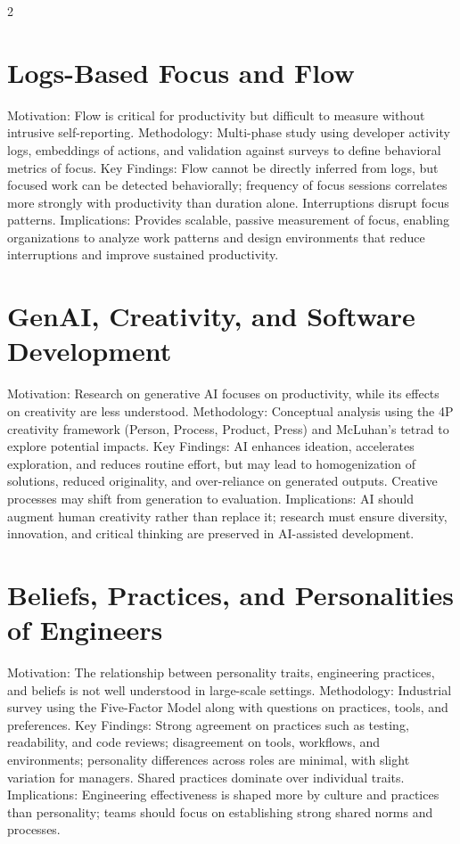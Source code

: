 \documentclass[8pt,a4paper]{extarticle}
\begin{document}
\begin{multicols*}{2}
    \section{Logs-Based Focus and Flow}
    Motivation: Flow is critical for productivity but difficult to measure without intrusive self-reporting. Methodology: Multi-phase study using developer activity logs, embeddings of actions, and validation against surveys to define behavioral metrics of focus. Key Findings: Flow cannot be directly inferred from logs, but focused work can be detected behaviorally; frequency of focus sessions correlates more strongly with productivity than duration alone. Interruptions disrupt focus patterns. Implications: Provides scalable, passive measurement of focus, enabling organizations to analyze work patterns and design environments that reduce interruptions and improve sustained productivity.

    \section{GenAI, Creativity, and Software Development}
    Motivation: Research on generative AI focuses on productivity, while its effects on creativity are less understood. Methodology: Conceptual analysis using the 4P creativity framework (Person, Process, Product, Press) and McLuhan’s tetrad to explore potential impacts. Key Findings: AI enhances ideation, accelerates exploration, and reduces routine effort, but may lead to homogenization of solutions, reduced originality, and over-reliance on generated outputs. Creative processes may shift from generation to evaluation. Implications: AI should augment human creativity rather than replace it; research must ensure diversity, innovation, and critical thinking are preserved in AI-assisted development.

    \section{Beliefs, Practices, and Personalities of Engineers}
    Motivation: The relationship between personality traits, engineering practices, and beliefs is not well understood in large-scale settings. Methodology: Industrial survey using the Five-Factor Model along with questions on practices, tools, and preferences. Key Findings: Strong agreement on practices such as testing, readability, and code reviews; disagreement on tools, workflows, and environments; personality differences across roles are minimal, with slight variation for managers. Shared practices dominate over individual traits. Implications: Engineering effectiveness is shaped more by culture and practices than personality; teams should focus on establishing strong shared norms and processes.


\end{multicols*}
\end{document}
